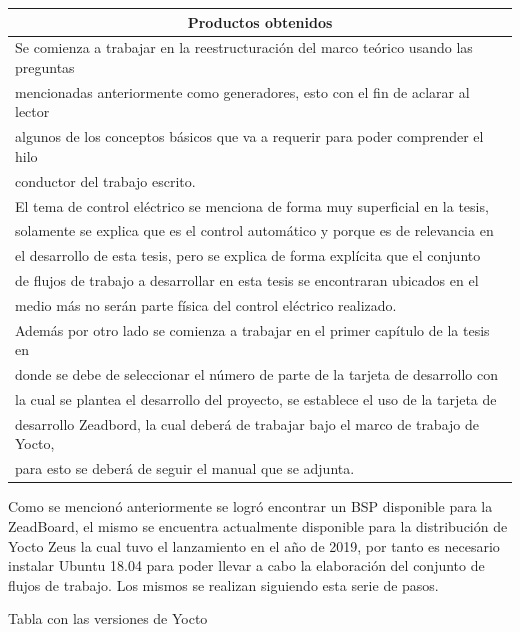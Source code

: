 \documentclass[12pt,letterpaper]{article}
\begin{document}
\begin{table}[h!]
{\begin{tabular}{|l|}
        \hline
        \multicolumn{1}{|c|}{Productos obtenidos} \\ \hline\hline
        Se comienza a trabajar en la reestructuración del marco teórico usando las preguntas \\
        mencionadas anteriormente como generadores, esto con el fin de aclarar al lector \\
        algunos de los conceptos básicos que va a requerir para poder comprender el hilo \\
        conductor del trabajo escrito.\\

        El tema de control eléctrico se menciona de forma muy superficial en la tesis,\\
        solamente se explica que es el control automático y porque es de relevancia en\\
        el desarrollo de esta tesis, pero se explica de forma explícita que el conjunto \\
        de flujos de trabajo a desarrollar en esta tesis se encontraran ubicados en el \\
        medio más no serán parte física del control eléctrico realizado.\\
        
        Además por otro lado se comienza a trabajar en el primer capítulo de la tesis en\\
        donde se debe de seleccionar el número de parte de la tarjeta de desarrollo con\\
        la cual se plantea el desarrollo del proyecto, se establece el uso de la tarjeta de \\
        desarrollo Zeadbord, la cual deberá de trabajar bajo el marco de trabajo de Yocto, \\
        para esto se deberá de seguir el manual que se adjunta. \\ \hline \hline  
    \end{tabular}}
\end{table}

Como se mencionó anteriormente se logró encontrar un BSP disponible para la ZeadBoard, el mismo
se encuentra actualmente disponible para la distribución de Yocto Zeus la cual tuvo el lanzamiento 
en el año de 2019, por tanto es necesario instalar Ubuntu 18.04 para poder llevar a cabo la elaboración
del conjunto de flujos de trabajo. Los mismos se realizan siguiendo esta serie de pasos. 

Tabla con las versiones de Yocto
\end{document}
